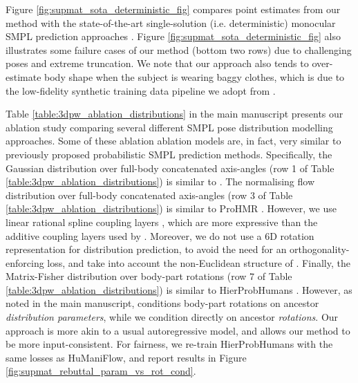  Figure \ref{fig:supmat_sota_deterministic_fig} compares point estimates from our method with the state-of-the-art single-solution (i.e. deterministic) monocular SMPL prediction approaches \cite{Kocabas_PARE_2021, li2020hybrik}. Figure \ref{fig:supmat_sota_deterministic_fig} also illustrates some failure cases of our method (bottom two rows) due to challenging poses and extreme truncation. We note that our approach also tends to over-estimate body shape when the subject is wearing baggy clothes, which is due to the low-fidelity synthetic training data pipeline we adopt from \cite{sengupta2021hierprobhuman}.




 Table \ref{table:3dpw_ablation_distributions} in the main manuscript presents our ablation study comparing several different SMPL pose distribution modelling approaches. Some of these ablation ablation models are, in fact, very similar to previously proposed probabilistic SMPL prediction methods. Specifically, the Gaussian distribution over full-body concatenated axis-angles (row 1 of Table \ref{table:3dpw_ablation_distributions}) is similar to \cite{sengupta2021probabilisticposeshape}. The normalising flow distribution over full-body concatenated axis-angles (row 3 of Table \ref{table:3dpw_ablation_distributions}) is similar to ProHMR \cite{kolotouros2021prohmr}. However, we use linear rational spline coupling layers \cite{dolatabadi2020lrs}, which are more expressive than the additive coupling layers \cite{dinh2015nice} used by \cite{kolotouros2021prohmr}. Moreover, we do not use a 6D rotation representation \cite{Zhou_2019_CVPR} for distribution prediction, to avoid the need for an orthogonality-enforcing loss, and take into account the non-Euclidean structure of . Finally, the Matrix-Fisher distribution over body-part rotations (row 7 of Table \ref{table:3dpw_ablation_distributions}) is similar to HierProbHumans \cite{sengupta2021hierprobhuman}. However, as noted in the main manuscript, \cite{sengupta2021hierprobhuman} conditions body-part rotations on ancestor \textit{distribution parameters}, while we condition directly on ancestor \textit{rotations}. Our approach is more akin to a usual autoregressive model, and allows our method to be more input-consistent. For fairness, we re-train HierProbHumans with the same losses as HuManiFlow, and report results in Figure \ref{fig:supmat_rebuttal_param_vs_rot_cond}. 

